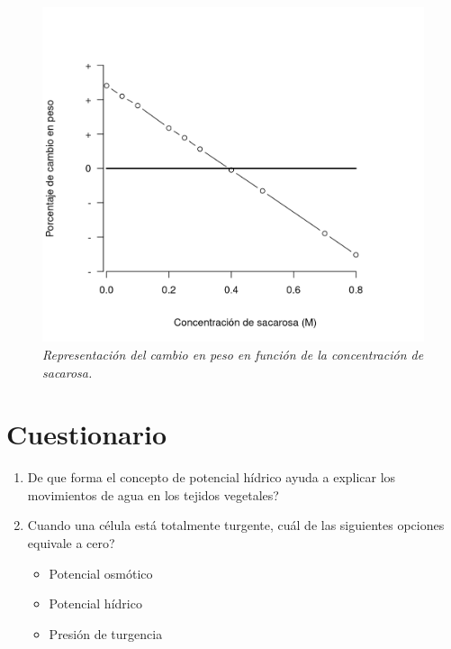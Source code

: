 \begin{figure}[h!]
	
	\begin{leftbar}
		
		\includegraphics[width=\textwidth]{graf_cambio}
		\centering
		\caption{\textit{Representaci\'on del cambio en peso en funci\'on de la concentraci\'on de sacarosa.}}
		\label{fig:ejem_concentracion}
		
	\end{leftbar}
	
\end{figure}


\section{Cuestionario}

\begin{enumerate}
	\item \textquestiondown De que forma el concepto de potencial h\'idrico ayuda a explicar los movimientos de agua en los tejidos vegetales?
	\item Cuando una c\'elula est\'a totalmente turgente, \textquestiondown cu\'al de las siguientes opciones equivale a cero?
		\begin{itemize}
			\item Potencial osm\'otico
			\item Potencial h\'idrico
			\item Presi\'on de turgencia
		\end{itemize}
\end{enumerate}

